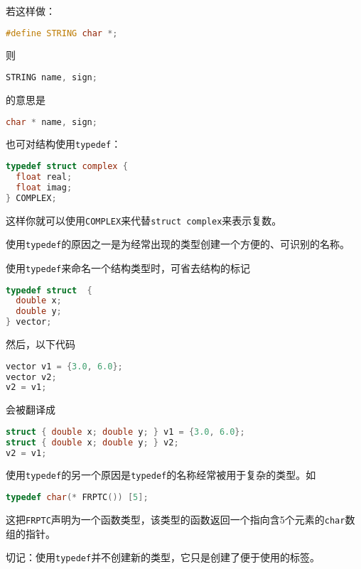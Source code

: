 \begin{frame}[fragile]\ft{\secname}
若这样做：
  \begin{lstlisting}[language=c,backgroundcolor=\color{red!20}]
#define STRING char *;
  \end{lstlisting}
则
  \begin{lstlisting}[language=c,backgroundcolor=\color{red!20}]
STRING name, sign;
  \end{lstlisting}
的意思是
  \begin{lstlisting}[language=c,backgroundcolor=\color{red!20}]
char * name, sign;
  \end{lstlisting}
\end{frame}

\begin{frame}[fragile]\ft{\secname}
也可对结构使用\verb|typedef|：
  \begin{lstlisting}[language=c,backgroundcolor=\color{red!20}]
typedef struct complex {
  float real;
  float imag;
} COMPLEX;
  \end{lstlisting}
  这样你就可以使用\verb|COMPLEX|来代替\verb|struct complex|来表示复数。\vspace{0.1in}


  {使用\verb|typedef|的原因之一是为经常出现的类型创建一个方便的、可识别的名称。}

\end{frame}

\begin{frame}[fragile]\ft{\secname}
使用\verb|typedef|来命名一个结构类型时，可省去结构的标记
  \begin{lstlisting}[language=c,backgroundcolor=\color{red!20}]
typedef struct  {
  double x;
  double y;
} vector;
  \end{lstlisting}
\end{frame}

\begin{frame}[fragile]\ft{\secname}
  然后，以下代码
  \begin{lstlisting}[language=c,backgroundcolor=\color{red!20}]
vector v1 = {3.0, 6.0};
vector v2;
v2 = v1;
  \end{lstlisting}
会被翻译成
  \begin{lstlisting}[language=c,backgroundcolor=\color{red!20}]
struct { double x; double y; } v1 = {3.0, 6.0};
struct { double x; double y; } v2;
v2 = v1;
  \end{lstlisting}
\end{frame}

\begin{frame}[fragile]\ft{\secname}
使用\verb|typedef|的另一个原因是\verb|typedef|的名称经常被用于复杂的类型。如
  \begin{lstlisting}[language=c,backgroundcolor=\color{red!20}]
typedef char(* FRPTC()) [5];
  \end{lstlisting}
这把\verb|FRPTC|声明为一个函数类型，该类型的函数返回一个指向含5个元素的\verb|char|数组的指针。
\end{frame}

\begin{frame}[fragile]\ft{\secname}
  切记：{使用\verb|typedef|并不创建新的类型，它只是创建了便于使用的标签。} 
\end{frame}
